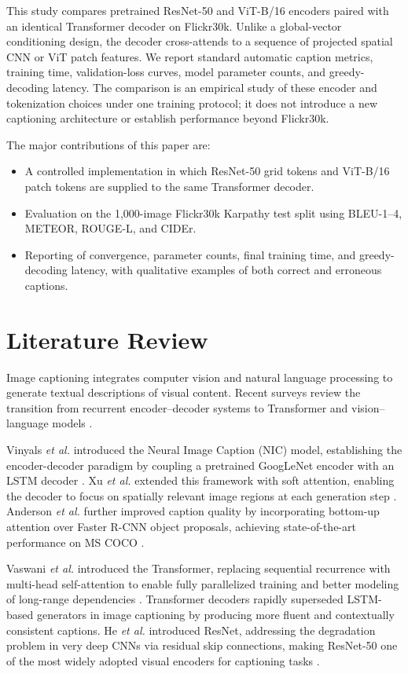 \documentclass[conference]{IEEEtran}
\begin{document}
This study compares pretrained ResNet-50 and ViT-B/16 encoders paired with an identical Transformer decoder on Flickr30k. Unlike a global-vector conditioning design, the decoder cross-attends to a sequence of projected spatial CNN or ViT patch features. We report standard automatic caption metrics, training time, validation-loss curves, model parameter counts, and greedy-decoding latency. The comparison is an empirical study of these encoder and tokenization choices under one training protocol; it does not introduce a new captioning architecture or establish performance beyond Flickr30k.

The major contributions of this paper are:

\begin{itemize}
    \item A controlled implementation in which ResNet-50 grid tokens and ViT-B/16 patch tokens are supplied to the same Transformer decoder.
    \item Evaluation on the 1{,}000-image Flickr30k Karpathy test split using BLEU-1--4, METEOR, ROUGE-L, and CIDEr.
    \item Reporting of convergence, parameter counts, final training time, and greedy-decoding latency, with qualitative examples of both correct and erroneous captions.
\end{itemize}

\section{Literature Review}

Image captioning integrates computer vision and natural language processing to generate textual descriptions of visual content. Recent surveys review the transition from recurrent encoder--decoder systems to Transformer and vision--language models \cite{stefanini2023,almalla2026}.

Vinyals \textit{et al.} introduced the Neural Image Caption (NIC) model, establishing the encoder-decoder paradigm by coupling a pretrained GoogLeNet encoder with an LSTM decoder \cite{vinyals2015}. Xu \textit{et al.} extended this framework with soft attention, enabling the decoder to focus on spatially relevant image regions at each generation step \cite{xu2015}. Anderson \textit{et al.} further improved caption quality by incorporating bottom-up attention over Faster R-CNN object proposals, achieving state-of-the-art performance on MS COCO \cite{anderson2018}.

Vaswani \textit{et al.} introduced the Transformer, replacing sequential recurrence with multi-head self-attention to enable fully parallelized training and better modeling of long-range dependencies \cite{vaswani2017}. Transformer decoders rapidly superseded LSTM-based generators in image captioning by producing more fluent and contextually consistent captions. He \textit{et al.} introduced ResNet, addressing the degradation problem in very deep CNNs via residual skip connections, making ResNet-50 one of the most widely adopted visual encoders for captioning tasks \cite{he2016}.
\end{document}
